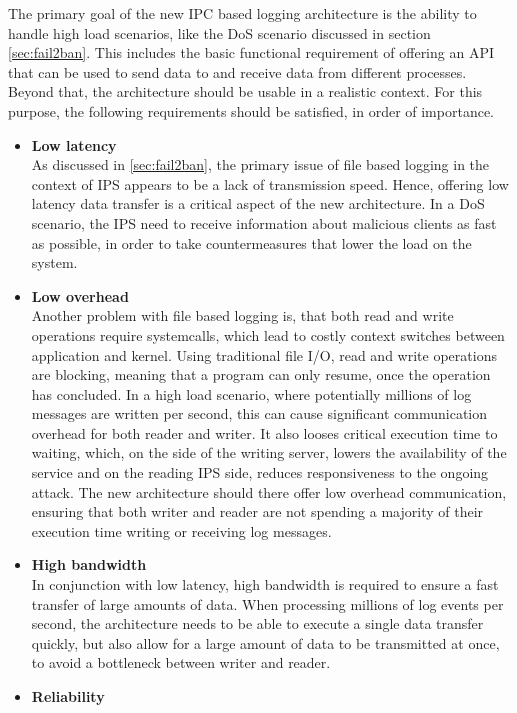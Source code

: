 The primary goal of the new \ac{IPC} based logging architecture is the ability to handle high load scenarios, like the \ac{DoS} scenario discussed in section \ref{sec:fail2ban}.
This includes the basic functional requirement of offering an API that can be used to send data to and receive data from different processes. Beyond that,
the architecture should be usable in a realistic context. For this purpose, the following requirements should be satisfied, in order of importance.
\begin{itemize}
    \item \textbf{Low latency} \\
    As discussed in \ref{sec:fail2ban},  the primary issue of file based logging in the context of \ac{IPS} appears to be a lack of transmission speed. Hence,
    offering low latency data transfer is a critical aspect of the new architecture. In a \ac{DoS} scenario, the \ac{IPS} need to receive information
    about malicious clients as fast as possible, in order to take countermeasures that lower the load on the system. 
    \item \textbf{Low overhead} \\
    Another problem with file based logging is, that both read and write operations require systemcalls, which lead to costly context switches between application and kernel. Using traditional
    file I/O, read and write operations are blocking, meaning that a program can only resume, once the operation has concluded. In a high load scenario, where potentially
    millions of log messages are written per second, this can cause significant communication overhead for both reader and writer. It also looses critical execution time to waiting,
    which, on the side of the writing server, lowers the availability of the service and on the reading \ac{IPS} side, reduces responsiveness to the ongoing attack. The new architecture should there offer low overhead communication,
    ensuring that both writer and reader are not spending a majority of their execution time writing or receiving log messages.
    \item \textbf{High bandwidth} \\
    In conjunction with  low latency, high bandwidth is required to ensure a fast transfer of large amounts of data. When processing millions of log events per second, the architecture
    needs to be able to execute a single data transfer quickly, but also allow for a large amount of data to be transmitted at once, to avoid a bottleneck between writer and reader.
    \item \textbf{Reliability} \\

\end{itemize}
